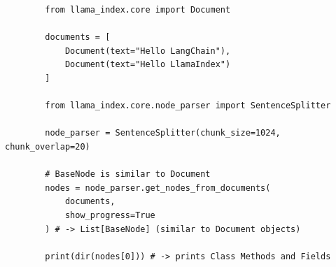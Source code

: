 \begin{listing}
    \begin{verbatim}
        from llama_index.core import Document
        
        documents = [
            Document(text="Hello LangChain"),
            Document(text="Hello LlamaIndex")
        ]
        
        from llama_index.core.node_parser import SentenceSplitter
        
        node_parser = SentenceSplitter(chunk_size=1024, chunk_overlap=20)
        
        # BaseNode is similar to Document
        nodes = node_parser.get_nodes_from_documents(
            documents,
            show_progress=True
        ) # -> List[BaseNode] (similar to Document objects)
        
        print(dir(nodes[0])) # -> prints Class Methods and Fields
    \end{verbatim}
    \caption[LlamaIndex BaseNode klasse]{LlamaIndex BaseNode klasse.}
    \label{lst:llamaindexbasenodeklasse}
\end{listing}

